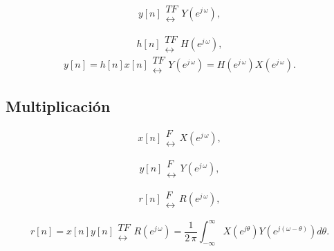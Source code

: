 \begin{equation}
y\left[ n\right] 
\begin{array}{l}
TF \\ 
\leftrightarrow
\end{array}
Y\left( e^{j \, \omega }\right) ,
\end{equation}

\begin{equation}
h\left[ n\right] 
\begin{array}{l}
TF \\ 
\leftrightarrow
\end{array}
H\left( e^{j \, \omega }\right) ,
\end{equation}
\begin{equation}
y\left[ n\right] =h\left[ n\right]  x\left[ n\right] 
\begin{array}{l}
TF \\ 
\leftrightarrow
\end{array}
Y\left( e^{j \, \omega }\right) =H\left( e^{j \, \omega }\right) X\left( e^{j \, \omega
}\right) .
\end{equation}

\subsection{Multiplicaci\'{o}n}

\begin{equation}
x\left[ n\right] 
\begin{array}{l}
F \\ 
\leftrightarrow
\end{array}
X\left( e^{j \, \omega }\right) ,
\end{equation}

\begin{equation}
y\left[ n\right] 
\begin{array}{l}
F \\ 
\leftrightarrow
\end{array}
Y\left( e^{j \, \omega }\right) ,
\end{equation}

\begin{equation}
r\left[ n\right] 
\begin{array}{l}
F \\ 
\leftrightarrow
\end{array}
R\left( e^{j \, \omega }\right) ,
\end{equation}

\begin{equation}
r\left[ n\right] =x\left[ n\right] y\left[ n\right] 
\begin{array}{l}
TF \\ 
\leftrightarrow
\end{array}
R\left( e^{j \, \omega }\right) =
\frac{1}{2 \, \pi }
\int_{-\infty }^{\infty }
  X\left(e^{j\theta }\right) Y\left( e^{j\left( \omega -\theta \right) }\right)d\theta .
\end{equation}
